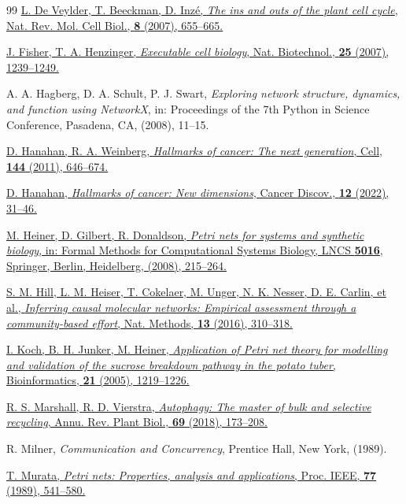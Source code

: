 \begin{thebibliography}{99}
\href{https://doi.org/10.1038/nrm2227}
{L. De Veylder, T. Beeckman, D. Inz\'e, \textit{The ins and outs of the plant
cell cycle}, Nat. Rev. Mol. Cell Biol., {\bf 8} (2007), 655--665.}

\href{https://doi.org/10.1038/nbt1356}
{J. Fisher, T. A. Henzinger, \textit{Executable cell biology}, Nat.
Biotechnol., {\bf 25} (2007), 1239--1249.}

A. A. Hagberg, D. A. Schult, P. J. Swart, \textit{Exploring network structure,
dynamics, and function using NetworkX}, in: Proceedings of the 7th Python in
Science Conference, Pasadena, CA, (2008), 11--15.

\href{https://doi.org/10.1016/j.cell.2011.02.013}
{D. Hanahan, R. A. Weinberg, \textit{Hallmarks of cancer: The next generation},
Cell, {\bf 144} (2011), 646--674.}

\href{https://doi.org/10.1158/2159-8290.CD-21-1059}
{D. Hanahan, \textit{Hallmarks of cancer: New dimensions}, Cancer Discov.,
{\bf 12} (2022), 31--46.}

\href{https://doi.org/10.1007/978-3-540-68894-5_7}
{M. Heiner, D. Gilbert, R. Donaldson, \textit{Petri nets for systems and
synthetic biology}, in: Formal Methods for Computational Systems Biology, LNCS
{\bf 5016}, Springer, Berlin, Heidelberg, (2008), 215--264.}

\href{https://doi.org/10.1038/nmeth.3773}
{S. M. Hill, L. M. Heiser, T. Cokelaer, M. Unger, N. K. Nesser, D. E. Carlin,
et al., \textit{Inferring causal molecular networks: Empirical assessment
through a community-based effort}, Nat. Methods, {\bf 13} (2016), 310--318.}

\href{https://doi.org/10.1093/bioinformatics/bti145}
{I. Koch, B. H. Junker, M. Heiner, \textit{Application of Petri net theory for
modelling and validation of the sucrose breakdown pathway in the potato tuber},
Bioinformatics, {\bf 21} (2005), 1219--1226.}

\href{https://doi.org/10.1146/annurev-arplant-042817-040606}
{R. S. Marshall, R. D. Vierstra, \textit{Autophagy: The master of bulk and
selective recycling}, Annu. Rev. Plant Biol., {\bf 69} (2018), 173--208.}

R. Milner, \textit{Communication and Concurrency}, Prentice Hall, New York,
(1989).

\href{https://doi.org/10.1109/5.24143}
{T. Murata, \textit{Petri nets: Properties, analysis and applications}, Proc.
IEEE, {\bf 77} (1989), 541--580.}


\end{thebibliography}
